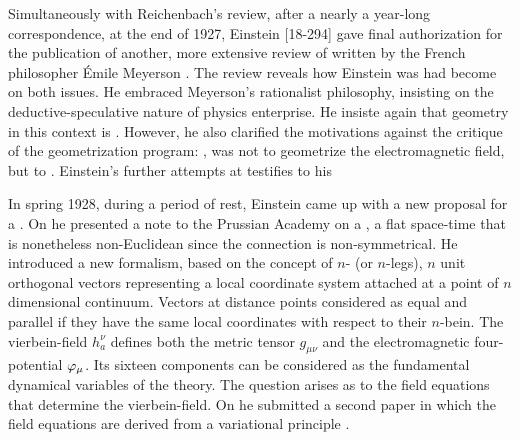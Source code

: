 \documentclass[draft]{article}
\renewcommand{\me}{;~m.e.{}}
\newcommand{\nbein}{$n$-bein\xspace}
\newcommand{\vbein}{vierbein\xspace}
\newcommand{\hbein}{\ensuremath{h_{a}^{\nu}}\xspace}
\begin{document}
Simultaneously with Reichenbach's review, after a nearly a year-long correspondence, at the end of 1927, Einstein [18-294] gave final authorization for the publication of another, more extensive review of  written by the French philosopher \'Emile Meyerson \citep{Meyerson1925}. The review reveals how Einstein was had become on both issues. He embraced Meyerson's rationalist philosophy, insisting on the deductive-speculative nature of physics enterprise. He insiste again that geometry in this context is  \citep[165\me]{Einstein1928b}. However, he also clarified the motivations against the critique of the geometrization program: , was not to geometrize the electromagnetic field, but to  \citep[165]{Einstein1928b}. Einstein's further attempts at \uft testifies to his 


In spring 1928, during a period of rest, Einstein came up with a new proposal for a \uft. On  he presented a note to the Prussian Academy on a  \citep{Einstein19281}, a flat space-time that is nonetheless non-Euclidean since the connection is non-symmetrical. He introduced a new formalism, based on the concept of $n$- (or $n$-legs), $n$ unit orthogonal vectors representing a local coordinate system attached at a point of $n$ dimensional continuum. Vectors at distance points considered as equal and parallel if they have the same local coordinates with respect to their \nbein. The \vbein-field \hbein defines both the metric tensor $g_{\mu \nu}$ and the electromagnetic four-potential $\varphi_{\mu}$. Its sixteen components can be considered as the fundamental dynamical variables of the theory. The question arises as to the field equations that determine the \vbein-field. On  he submitted a second paper in which the field equations are derived from a variational principle \citep{Einstein19282}.
\end{document}
